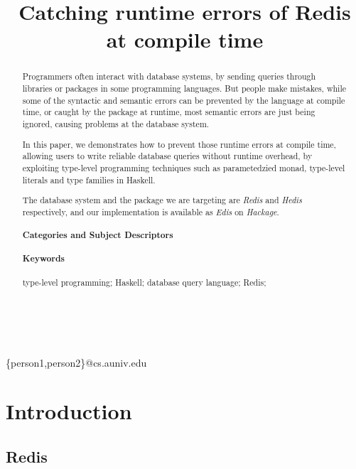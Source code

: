 \documentclass[pldi]{sigplanconf-pldi16}
\begin{document}
\title{Catching runtime errors of Redis at compile time}

%
%

{ \\
  \\
}
{\{person1,person2\}@cs.auniv.edu}

\maketitle

\begin{abstract}
Programmers often interact with database systems, by sending queries through
libraries or packages in some programming languages. But people make mistakes,
while some of the syntactic and semantic errors can be prevented by the language
at compile time, or caught by the package at runtime, most semantic errors are
just being ignored, causing problems at the database system.

In this paper, we demonstrates how to prevent those runtime errors at compile
time, allowing users to write reliable database queries without runtime
overhead, by exploiting type-level programming techniques such as parametedzied
monad, type-level literals and type families in Haskell.

The database system and the package we are targeting
are \emph{Redis} and \emph{Hedis} respectively, and our implementation is
available as \emph{Edis} on \emph{Hackage}.

\paragraph{Categories and Subject Descriptors}
\paragraph{Keywords}
type-level programming; Haskell; database query language; Redis;
\end{abstract}

\section{Introduction}

\subsection{Redis}
\end{document}
